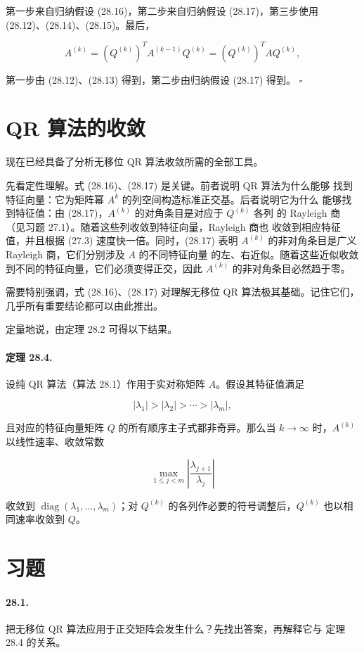 \documentclass[UTF8,fontset=none,12pt]{ctexart}
\begin{document}
第一步来自归纳假设 (28.16)，第二步来自归纳假设 (28.17)，第三步使用
(28.12)、(28.14)、(28.15)。最后，

\[
A^{(k)}=(Q^{(k)})^TA^{(k-1)}Q^{(k)}
        =(Q^{(k)})^TAQ^{(k)},
\]

第一步由 (28.12)、(28.13) 得到，第二步由归纳假设 (28.17) 得到。
\hfill$\square$

\section*{QR 算法的收敛}

现在已经具备了分析无移位 QR 算法收敛所需的全部工具。

先看定性理解。式 (28.16)、(28.17) 是关键。前者说明 QR 算法为什么能够
找到特征向量：它为矩阵幂 $A^k$ 的列空间构造标准正交基。后者说明它为什么
能够找到特征值：由 (28.17)，$A^{(k)}$ 的对角条目是对应于 $Q^{(k)}$ 各列
的 Rayleigh 商（见习题 27.1）。随着这些列收敛到特征向量，Rayleigh 商也
收敛到相应特征值，并且根据 (27.3) 速度快一倍。同时，(28.17) 表明
$A^{(k)}$ 的非对角条目是广义 Rayleigh 商，它们分别涉及 $A$ 的不同特征向量
的左、右近似。随着这些近似收敛到不同的特征向量，它们必须变得正交，因此
$A^{(k)}$ 的非对角条目必然趋于零。

需要特别强调，式 (28.16)、(28.17) 对理解无移位 QR 算法极其基础。记住它们，
几乎所有重要结论都可以由此推出。

定量地说，由定理 28.2 可得以下结果。

\paragraph{定理 28.4.}
设纯 QR 算法（算法 28.1）作用于实对称矩阵 $A$。假设其特征值满足

\[
|\lambda_1|>|\lambda_2|>\cdots>|\lambda_m|,
\]

且对应的特征向量矩阵 $Q$ 的所有顺序主子式都非奇异。那么当 $k\to\infty$
时，$A^{(k)}$ 以线性速率、收敛常数

\[
\max_{1\le j<m}\left|\frac{\lambda_{j+1}}{\lambda_j}\right|
\]

收敛到 $\operatorname{diag}(\lambda_1,\ldots,\lambda_m)$；对 $Q^{(k)}$
的各列作必要的符号调整后，$Q^{(k)}$ 也以相同速率收敛到 $Q$。

\section*{习题}

\paragraph{28.1.}
把无移位 QR 算法应用于正交矩阵会发生什么？先找出答案，再解释它与
定理 28.4 的关系。
\end{document}
